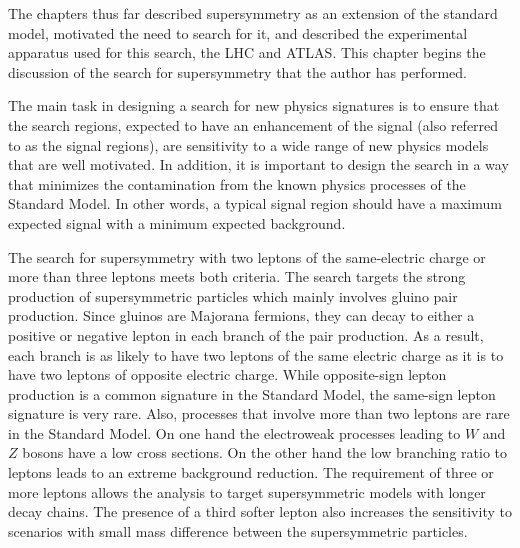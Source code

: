 The chapters thus far described supersymmetry as an extension of the standard 
model, motivated the need to search for it, and described the experimental 
apparatus used for this search, the LHC and ATLAS. 
This chapter begins the discussion of the search for supersymmetry that the 
author has performed.

The main task in designing a search for new physics signatures is to ensure 
that the search regions, expected to have an enhancement of the signal
 (also referred to as the signal regions), are sensitivity to 
 a wide 
range of new physics models that are well motivated.
In addition, it is important to design the search in a way that minimizes the
contamination from the known physics processes of the Standard Model.
In other words, a typical signal region should have a maximum expected 
signal with a minimum expected background. 

The search for supersymmetry with two leptons of the same-electric charge
or more than three leptons meets both criteria. 
The search targets the strong production of supersymmetric particles 
which mainly involves gluino pair production. Since gluinos are Majorana 
fermions, they can decay to either a positive or negative lepton in each branch
of the pair production. As a result, each branch is as likely to have two leptons 
of the same electric charge as it is to have two leptons of opposite electric
charge. While opposite-sign lepton production is a common signature in the 
Standard Model, the same-sign lepton signature is very rare. 
Also, processes that involve more than two leptons are rare in the 
Standard Model. On one hand the electroweak processes leading to 
$W$ and $Z$ bosons have a low cross sections. On the other hand the low 
branching ratio to leptons leads to an extreme background reduction.
The requirement of three or more leptons allows the analysis 
to target supersymmetric models with longer decay chains. The presence of 
a third softer lepton also increases the sensitivity to scenarios with 
small mass difference between the supersymmetric particles.

